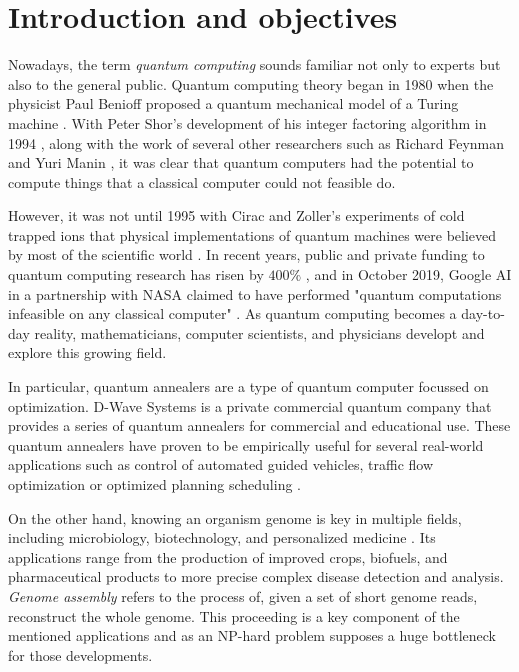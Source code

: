 \chapter*{Introduction and objectives}

Nowadays, the term \emph{quantum computing} sounds familiar not only to experts but also to the general public. Quantum computing theory began in 1980 when the physicist Paul Benioff proposed a quantum mechanical model of a Turing machine \cite{Benioff1980}. With Peter Shor's development of his integer factoring algorithm in 1994 \cite{Shor1999}, along with the work of several other researchers such as Richard Feynman and Yuri Manin\cite{Feynman1982} \cite{Manin1980}, it was clear that quantum computers had the potential to compute things that a classical computer could not feasible do.

However, it was not until 1995 with Cirac and Zoller's experiments of cold trapped ions that physical implementations of quantum machines were believed by most of the scientific world \cite{Cirac1995}. In recent years, public and private funding to quantum computing research has risen by $400\%$ \cite{Gibney2019}, and in October 2019, Google AI in a partnership with NASA claimed to have performed "quantum computations infeasible on any classical computer" \cite{Pednault2019}. As quantum computing becomes a day-to-day reality, mathematicians, computer scientists, and physicians developt and explore this growing field.

In particular, quantum annealers are a type of quantum computer focussed on optimization. D-Wave Systems is a private commercial quantum company that provides a series of quantum annealers for commercial and educational use. These quantum annealers have proven to be empirically useful for several real-world applications such as control of automated guided vehicles, traffic flow optimization or optimized planning scheduling \cite{Neukart2017} \cite{Ohzeki2019} \cite{Desimone2019}.

On the other hand, knowing an organism genome is key in multiple fields, including microbiology, biotechnology, and personalized medicine \cite{Costessi2018} \cite{Ginsburg2009} \cite{Abdallah2015}. Its applications range from the production of improved crops, biofuels, and pharmaceutical products to more precise complex disease detection and analysis. \emph{Genome assembly} refers to the process of, given a set of short genome reads, reconstruct the whole genome. This proceeding is a key component of the mentioned applications and as an NP-hard problem supposes a huge bottleneck for those developments. 

